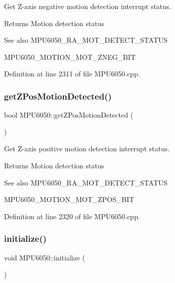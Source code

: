 Get Z-\/axis negative motion detection interrupt status. 

\begin{DoxyReturn}{Returns}
Motion detection status 
\end{DoxyReturn}
\begin{DoxySeeAlso}{See also}
M\+P\+U6050\+\_\+\+R\+A\+\_\+\+M\+O\+T\+\_\+\+D\+E\+T\+E\+C\+T\+\_\+\+S\+T\+A\+T\+US 

M\+P\+U6050\+\_\+\+M\+O\+T\+I\+O\+N\+\_\+\+M\+O\+T\+\_\+\+Z\+N\+E\+G\+\_\+\+B\+IT 
\end{DoxySeeAlso}


Definition at line 2311 of file M\+P\+U6050.\+cpp.

\mbox{\label{classMPU6050_a33c766cd415fc5780417b1ed76717875}} 
\subsubsection{\texorpdfstring{getZPosMotionDetected()}{getZPosMotionDetected()}}
{\footnotesize\ttfamily bool M\+P\+U6050\+::get\+Z\+Pos\+Motion\+Detected (\begin{DoxyParamCaption}{ }\end{DoxyParamCaption})}



Get Z-\/axis positive motion detection interrupt status. 

\begin{DoxyReturn}{Returns}
Motion detection status 
\end{DoxyReturn}
\begin{DoxySeeAlso}{See also}
M\+P\+U6050\+\_\+\+R\+A\+\_\+\+M\+O\+T\+\_\+\+D\+E\+T\+E\+C\+T\+\_\+\+S\+T\+A\+T\+US 

M\+P\+U6050\+\_\+\+M\+O\+T\+I\+O\+N\+\_\+\+M\+O\+T\+\_\+\+Z\+P\+O\+S\+\_\+\+B\+IT 
\end{DoxySeeAlso}


Definition at line 2320 of file M\+P\+U6050.\+cpp.

\mbox{\label{classMPU6050_abd8fc6c18adf158011118fbccc7e7054}} 
\subsubsection{\texorpdfstring{initialize()}{initialize()}}
{\footnotesize\ttfamily void M\+P\+U6050\+::initialize (\begin{DoxyParamCaption}{ }\end{DoxyParamCaption})}



